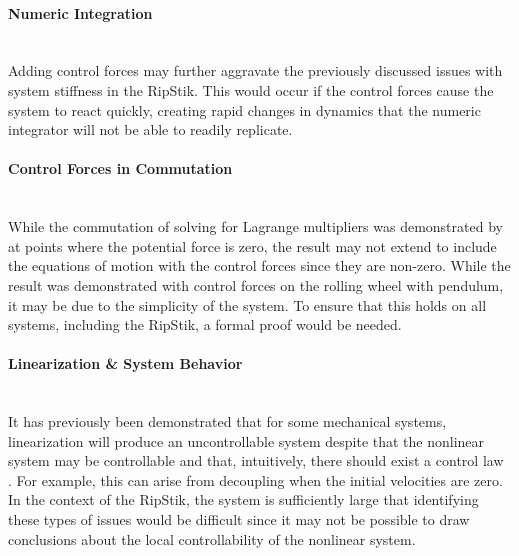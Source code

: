 \paragraph{Numeric Integration}\mbox{}\\
Adding control forces may further aggravate the previously discussed issues with system stiffness in the RipStik. 
This would occur if the control forces cause the system to react quickly, creating rapid changes in dynamics that the numeric integrator will not be able to readily replicate.
\paragraph{Control Forces in Commutation}\mbox{}\\
While the commutation of solving for Lagrange multipliers was demonstrated by \cite{LinNonHolo} at points where the potential force is zero, the result may not extend to include the equations of motion with the control forces since they are non-zero. 
While the result was demonstrated with control forces on the rolling wheel with pendulum, it may be due to the simplicity of the system. 
To ensure that this holds on all systems, including the RipStik, a formal proof would be needed.
\paragraph{Linearization \& System Behavior}\mbox{}\\
It has previously been demonstrated that for some mechanical systems, linearization will produce an uncontrollable system despite that the nonlinear system may be controllable and that, intuitively, there should exist a control law \cite{CCSMCS}. 
For example, this can arise from decoupling when the initial velocities are zero. 
In the context of the RipStik, the system is sufficiently large that identifying these types of issues would be difficult since it may not be possible to draw conclusions about the local controllability of the nonlinear system.


